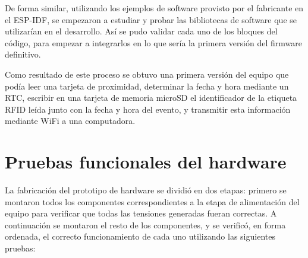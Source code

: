 De forma similar, utilizando los ejemplos de software provisto por el fabricante en el ESP-IDF, se empezaron a estudiar y probar las bibliotecas de software que se utilizarían en el desarrollo. Así se pudo validar cada uno de los bloques del código, para empezar a integrarlos en lo que sería la primera versión del firmware definitivo. 

Como resultado de este proceso se obtuvo una primera versión del equipo que podía leer una tarjeta de proximidad, determinar la fecha y hora mediante un RTC, escribir en una tarjeta de memoria microSD el identificador de la etiqueta RFID leída junto con la fecha y hora del evento, y transmitir esta información mediante WiFi a una computadora.

\section{Pruebas funcionales del hardware}
\label{sec:pruebasHW}

La fabricación del prototipo de hardware se dividió en dos etapas: primero se montaron todos los componentes correspondientes a la etapa de alimentación del equipo para verificar que todas las tensiones generadas fueran correctas. A continuación se montaron el resto de los componentes, y se verificó, en forma ordenada, el correcto funcionamiento de cada uno utilizando las siguientes pruebas:

